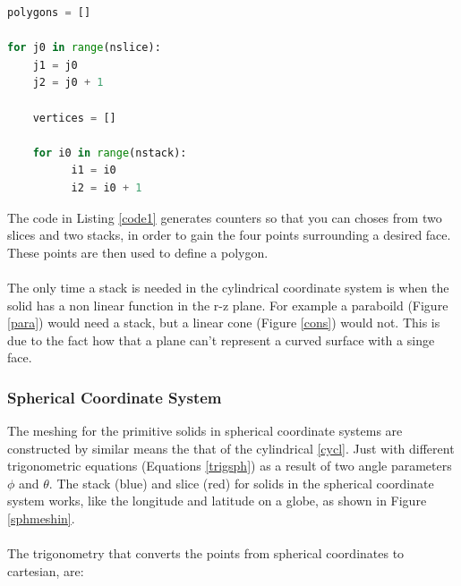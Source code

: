 \documentclass[12pt,a4paper]{article}
\begin{document}
\begin{lstlisting}[language=Python, label=code1, caption=Basic method structure for pyg4ometry primitive meshing of solids]
polygons = []

for j0 in range(nslice):
    j1 = j0
    j2 = j0 + 1
    
    vertices = []

    for i0 in range(nstack):
          i1 = i0
          i2 = i0 + 1     

\end{lstlisting}
The code in Listing \ref{code1} generates counters so that you can choses from two slices and two stacks, in order to gain the four points surrounding a desired face. These points are then used to define a polygon. 
\\\\
The only time a stack is needed in the cylindrical coordinate system is when the solid has a non linear function in the r-z plane. For example a paraboild (Figure \ref{para}) would need a stack, but a linear cone (Figure \ref{cons}) would not. This is due to the fact how that a plane can't represent a curved surface with a singe face. 

\newpage
\subsubsection{Spherical Coordinate System}

The meshing for the primitive solids in spherical coordinate systems are constructed by similar means the that of the cylindrical \ref{cycl}. Just with different trigonometric equations (Equations \ref{trigsph}) as a result of two angle parameters $\phi$ and $\theta$. The stack (blue) and slice (red) for solids in the spherical coordinate system works, like the longitude and latitude on a globe, as shown in Figure \ref{sphmeshin}. 
\\\\
The trigonometry that converts the points from spherical coordinates to cartesian, are:
\end{document}
